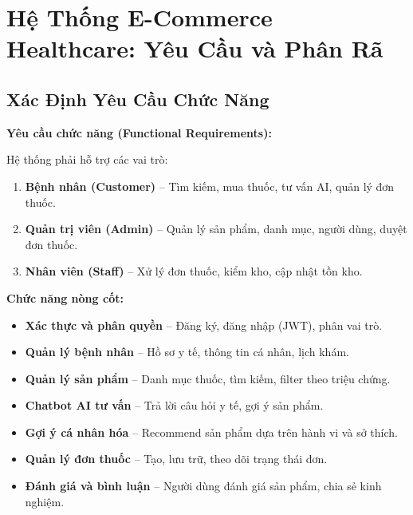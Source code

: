 \documentclass[12pt,a4paper]{article}
\begin{document}

\newpage
\section{Hệ Thống E-Commerce Healthcare: Yêu Cầu và Phân Rã}

\subsection{Xác Định Yêu Cầu Chức Năng}

\textbf{Yêu cầu chức năng (Functional Requirements):}

Hệ thống phải hỗ trợ các vai trò:
\begin{enumerate}
    \item \textbf{Bệnh nhân (Customer)} – Tìm kiếm, mua thuốc, tư vấn AI, quản lý đơn thuốc.
    
    \item \textbf{Quản trị viên (Admin)} – Quản lý sản phẩm, danh mục, người dùng, duyệt đơn thuốc.
    
    \item \textbf{Nhân viên (Staff)} – Xử lý đơn thuốc, kiểm kho, cập nhật tồn kho.
\end{enumerate}

\textbf{Chức năng nòng cốt:}
\begin{itemize}
    \item \textbf{Xác thực và phân quyền} – Đăng ký, đăng nhập (JWT), phân vai trò.
    
    \item \textbf{Quản lý bệnh nhân} – Hồ sơ y tế, thông tin cá nhân, lịch khám.
    
    \item \textbf{Quản lý sản phẩm} – Danh mục thuốc, tìm kiếm, filter theo triệu chứng.
    
    \item \textbf{Chatbot AI tư vấn} – Trả lời câu hỏi y tế, gợi ý sản phẩm.
    
    \item \textbf{Gợi ý cá nhân hóa} – Recommend sản phẩm dựa trên hành vi và sở thích.
    
    \item \textbf{Quản lý đơn thuốc} – Tạo, lưu trữ, theo dõi trạng thái đơn.
    
    \item \textbf{Đánh giá và bình luận} – Người dùng đánh giá sản phẩm, chia sẻ kinh nghiệm.
\end{itemize}
\end{document}
